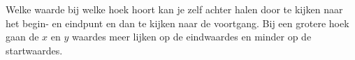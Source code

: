 \documentclass[preview]{standalone}
\begin{document}
\begin{center}
Welke waarde bij welke hoek hoort kan je zelf achter halen door te kijken naar het begin- en eindpunt en dan te kijken naar de voortgang. Bij een grotere hoek gaan de $x$ en $y$ waardes meer lijken op de eindwaardes en minder op de startwaardes.
\end{center}
\end{document}
